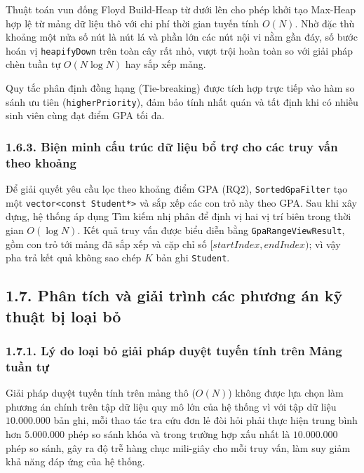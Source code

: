 \documentclass[14pt,a4paper]{extarticle}
\begin{document}
Thuật toán vun đống Floyd Build-Heap từ dưới lên cho phép khởi tạo Max-Heap hợp lệ từ mảng dữ liệu thô với chi phí thời gian tuyến tính $O(N)$. Nhờ đặc thù khoảng một nửa số nút là nút lá và phần lớn các nút nội vi nằm gần đáy, số bước hoán vị \texttt{heapifyDown} trên toàn cây rất nhỏ, vượt trội hoàn toàn so với giải pháp chèn tuần tự $O(N \log N)$ hay sắp xếp mảng.

Quy tắc phân định đồng hạng (Tie-breaking) được tích hợp trực tiếp vào hàm so sánh ưu tiên (\texttt{higherPriority}), đảm bảo tính nhất quán và tất định khi có nhiều sinh viên cùng đạt điểm GPA tối đa.

\subsubsection*{1.6.3. Biện minh cấu trúc dữ liệu bổ trợ cho các truy vấn theo khoảng}
{}

Để giải quyết yêu cầu lọc theo khoảng điểm GPA (RQ2), \texttt{SortedGpaFilter} tạo một \texttt{vector<const Student*>} và sắp xếp các con trỏ này theo GPA. Sau khi xây dựng, hệ thống áp dụng Tìm kiếm nhị phân để định vị hai vị trí biên trong thời gian $O(\log N)$. Kết quả truy vấn được biểu diễn bằng \texttt{GpaRangeViewResult}, gồm con trỏ tới mảng đã sắp xếp và cặp chỉ số $[startIndex, endIndex)$; vì vậy pha trả kết quả không sao chép $K$ bản ghi \texttt{Student}.

\subsection*{1.7. Phân tích và giải trình các phương án kỹ thuật bị loại bỏ}
{}

\subsubsection*{1.7.1. Lý do loại bỏ giải pháp duyệt tuyến tính trên Mảng tuần tự}
{}

Giải pháp duyệt tuyến tính trên mảng thô ($O(N)$) không được lựa chọn làm phương án chính trên tập dữ liệu quy mô lớn của hệ thống vì với tập dữ liệu $10.000.000$ bản ghi, mỗi thao tác tra cứu đơn lẻ đòi hỏi phải thực hiện trung bình hơn $5.000.000$ phép so sánh khóa và trong trường hợp xấu nhất là $10.000.000$ phép so sánh, gây ra độ trễ hàng chục mili-giây cho mỗi truy vấn, làm suy giảm khả năng đáp ứng của hệ thống.
\end{document}
